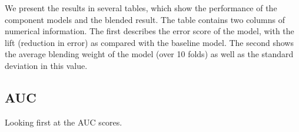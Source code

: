 \documentclass{article}
\begin{document}

We present the results in several tables, which show the performance of the component models and the blended result.  The table contains two columns of numerical information.  The first describes the error score of the model, with the lift (reduction in error) as compared with the baseline model.  The second shows the average blending weight of the model (over 10 folds) as well as the standard deviation in this value.

\subsection{AUC}

Looking first at the AUC scores.

\end{document}
